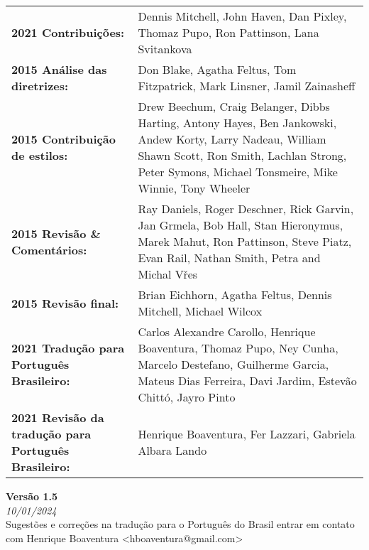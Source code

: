 \begin{titlepage}
        \begin{tabular}{ p{6.5cm} p{11.5cm} }
            \textbf{2021 Contribuições:}	& Dennis Mitchell, John Haven, Dan Pixley, Thomaz Pupo, Ron Pattinson, Lana Svitankova \\
            \textbf{2015 Análise das diretrizes:} & Don Blake, Agatha Feltus, Tom Fitzpatrick, Mark Linsner, Jamil Zainasheff \\
            \textbf{2015 Contribuição de estilos:} & Drew Beechum, Craig Belanger, Dibbs Harting, Antony Hayes, Ben Jankowski, Andew Korty,
            Larry Nadeau, William Shawn Scott, Ron Smith, Lachlan Strong, Peter Symons, Michael Tonsmeire, Mike Winnie, Tony Wheeler \\
            \textbf{2015 Revisão \& Comentários:} & Ray Daniels, Roger Deschner, Rick Garvin, Jan Grmela, Bob Hall, Stan Hieronymus, Marek Mahut, Ron Pattinson, Steve Piatz, Evan Rail, Nathan Smith, Petra and Michal Vřes\\
            \textbf{2015 Revisão final:} & Brian Eichhorn, Agatha Feltus, Dennis Mitchell, Michael Wilcox  \\
            \textbf{2021 Tradução para Português Brasileiro:} & Carlos Alexandre Carollo, Henrique Boaventura, Thomaz Pupo, Ney Cunha, Marcelo Destefano, Guilherme Garcia, Mateus Dias Ferreira, Davi Jardim, Estevão Chittó, Jayro Pinto \\
            \textbf{2021 Revisão da tradução para Português Brasileiro:} & Henrique Boaventura, Fer Lazzari, Gabriela Albara Lando
        \end{tabular}
        \vspace{0.5cm}
        \textbf{Versão 1.5}\\
        \footnotesize{\textit{10/01/2024}}\\
        \vspace{0.4cm}
        \footnotesize{Sugestões e correções na tradução para o Português do Brasil entrar em contato com Henrique Boaventura <hboaventura@gmail.com>}

\end{titlepage}
